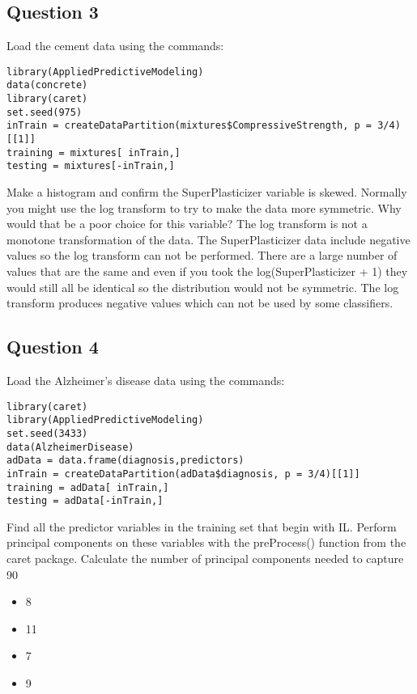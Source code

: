\documentclass[DSS8main.tex]{subfiles}
\begin{document}
\subsection*{Question 3}
Load the cement data using the commands:
\begin{framed}
\begin{verbatim}
library(AppliedPredictiveModeling)
data(concrete)
library(caret)
set.seed(975)
inTrain = createDataPartition(mixtures$CompressiveStrength, p = 3/4)[[1]]
training = mixtures[ inTrain,]
testing = mixtures[-inTrain,]
\end{verbatim}
\end{framed}
Make a histogram and confirm the SuperPlasticizer variable is skewed. Normally you might use the log transform to try to make the data more symmetric. Why would that be a poor choice for this variable?
The log transform is not a monotone transformation of the data.
The SuperPlasticizer data include negative values so the log transform can not be performed.
There are a large number of values that are the same and even if you took the log(SuperPlasticizer + 1) they would still all be identical so the distribution would not be symmetric.
The log transform produces negative values which can not be used by some classifiers.
\subsection*{Question 4}
Load the Alzheimer's disease data using the commands:
\begin{framed}
\begin{verbatim}
library(caret)
library(AppliedPredictiveModeling)
set.seed(3433)
data(AlzheimerDisease)
adData = data.frame(diagnosis,predictors)
inTrain = createDataPartition(adData$diagnosis, p = 3/4)[[1]]
training = adData[ inTrain,]
testing = adData[-inTrain,]
\end{verbatim}
\end{framed}
Find all the predictor variables in the training set that begin with IL. Perform principal components on these variables with the preProcess() function from the caret package. Calculate the number of principal components needed to capture 90%

\begin{itemize}
\item 8
\item 11
\item 7
\item 9
\end{itemize}
\end{document}
